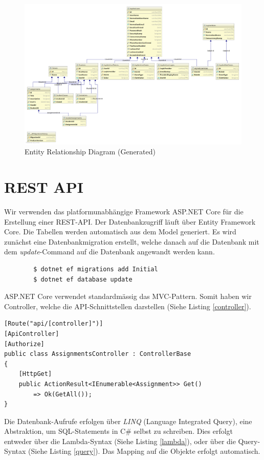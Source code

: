 \documentclass[a4paper, titlepage]{article}
\begin{document}
    \begin{figure}
        \includegraphics[width=\textwidth]{uml2}
        \caption{Entity Relationship Diagram (Generated)}
    \end{figure}

    \section{REST API}
    Wir verwenden das platformunabhängige Framework ASP.NET Core für die Erstellung einer REST-API.
    Der Datenbankzugriff läuft über Entity Framework Core. Die Tabellen werden automatisch aus dem Model
    generiert. Es wird zunächst eine Datenbankmigration erstellt, welche danach auf die Datenbank mit dem
    \emph{update}-Command auf die Datenbank angewandt werden kann.
    \begin{verbatim}
        $ dotnet ef migrations add Initial
        $ dotnet ef database update
    \end{verbatim}
    ASP.NET Core verwendet standardmässig das MVC-Pattern. Somit haben wir Controller, welche die API-Schnittstellen
    darstellen (Siehe Listing \ref{controller}).


    \lstset{style=sharpc}
    \begin{lstlisting}[caption=Controller, label=controller]
[Route("api/[controller]")]
[ApiController]
[Authorize]
public class AssignmentsController : ControllerBase
{
    [HttpGet]
    public ActionResult<IEnumerable<Assignment>> Get()
        => Ok(GetAll());
}
    \end{lstlisting}

    Die Datenbank-Aufrufe erfolgen über \emph{LINQ} (Language Integrated Query), eine Abstraktion, um
    SQL-Statements in C\# selbst zu schreiben. Dies erfolgt entweder über die Lambda-Syntax (Siehe Listing \ref{lambda}), oder über die Query-Syntax
    (Siehe Listing \ref{query}). Das Mapping auf die Objekte erfolgt automatisch.
\end{document}
